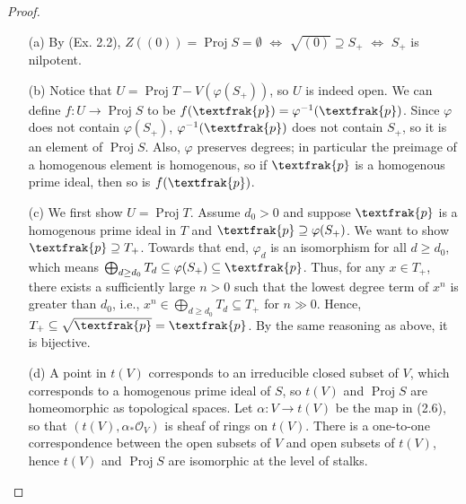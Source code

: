 \documentclass{article}
\newcommand{\goth}[1]{\textfrak{#1}}
\newcommand{\fO}{\mathscr{O}}
\DeclareMathOperator{\proj}{Proj}
\begin{document}
\begin{enumerate} [label=\textbf{\arabic*.}, leftmargin=0em]
\begin{proof} $ $ \vspace{0pt}
    \begin{itemize} [leftmargin=0cm]
        \item[(a)] By (Ex. 2.2), $Z((0)) = \proj{S} = \emptyset$ $\iff$ $\sqrt{(0)} \supseteq S_+$ $\iff$ $S_+$ is nilpotent.

        \item[(b)] Notice that $U = \proj{T} - V(\varphi(S_+))$, so $U$ is indeed open. We can define $f : U \to \proj{S}$ to be $f(\goth{p}) = \varphi^{-1}(\goth{p})$. Since $\varphi$ does not contain $\varphi(S_+)$, $\varphi^{-1}(\goth{p})$ does not contain $S_+$, so it is an element of $\proj{S}$. Also, $\varphi$ preserves degrees; in particular the preimage of a homogenous element is homogenous, so if $\goth{p}$ is a homogenous prime ideal, then so is $f(\goth{p})$.

        \item[(c)] We first show $U = \proj{T}$. Assume $d_0 > 0$ and suppose $\goth{p}$ is a homogenous prime ideal in $T$ and $\goth{p} \supseteq \varphi(S_+)$. We want to show $\goth{p} \supseteq T_+$. Towards that end, $\varphi_d$ is an isomorphism for all $d \geq d_0$, which means $\bigoplus_{d \geq d_0} T_d \subseteq \varphi(S_+) \subseteq \goth{p}$. Thus, for any $x \in T_+$, there exists a sufficiently large $n > 0$ such that the lowest degree term of $x^n$ is greater than $d_0$, i.e., $x^n \in \bigoplus_{d \geq d_0} T_d \subseteq T_+$ for $n \gg 0$. Hence, $T_+ \subseteq \sqrt{\goth{p}} = \goth{p}$. By the same reasoning as above, it is bijective.

        \item[(d)] A point in $t(V)$ corresponds to an irreducible closed subset of $V$, which corresponds to a homogenous prime ideal of $S$, so $t(V)$ and $\proj{S}$ are homeomorphic as topological spaces. Let $\alpha : V \to t(V)$ be the map in (2.6), so that $(t(V), \alpha_* \fO_V)$ is sheaf of rings on $t(V)$. There is a one-to-one correspondence between the open subsets of $V$ and open subsets of $t(V)$, hence $t(V)$ and $\proj{S}$ are isomorphic at the level of stalks.
    \end{itemize}
\end{proof}


\end{enumerate}
\end{document}
